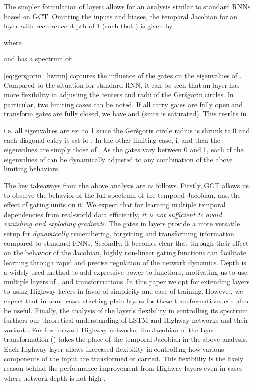 \documentclass[letterpaper]{article}
\def\gers{Ger\v{s}gorin}
\def\gct{GCT}
\def\srnn{standard RNN}
\begin{document}
The simpler formulation of \arch{} layers allows for an analysis similar to \srnn{s} based on GCT.
Omitting the inputs and biases, the temporal Jacobian  for an \arch{} layer with recurrence depth of 1 (such that ) is given by


where

and has a spectrum of:
 

\autoref{eq:gersgorin_hwrnn} captures the influence of the gates on the eigenvalues of . 
Compared to the situation for \srnn{}, it can be seen that an \arch{} layer has more flexibility in adjusting the centers and radii of the \gers{} circles. 
In particular, two limiting cases can be noted. If all carry gates are fully open and transform gates are fully closed, we have  and  (since  is saturated).
This results in

i.e. all eigenvalues are set to 1 since the \gers{} circle radius is shrunk to 0 and each diagonal entry is set to .  In the other limiting case, if  and  then the eigenvalues are simply those of .
As the gates vary between 0 and 1, each of the eigenvalues of  can be dynamically adjusted to any combination of the above limiting behaviors.

The key takeaways from the above analysis are as follows. 
Firstly, \gct{} allows us to observe the behavior of the full spectrum of the temporal Jacobian, and the effect of gating units on it.
We expect that for learning multiple temporal dependencies from real-world data efficiently, \emph{it is not sufficient to avoid vanishing and exploding gradients}.
The gates in \arch{} layers provide a more versatile setup for \emph{dynamically} remembering, forgetting and transforming information compared to \srnn{}s.
Secondly, it becomes clear that through their effect on the behavior of the Jacobian, highly non-linear gating functions can facilitate learning through rapid and precise regulation of the network dynamics.
Depth is a widely used method to add expressive power to functions, motivating us to use multiple layers of ,  and  transformations.
In this paper we opt for extending \arch{} layers to  using Highway layers in favor of simplicity and ease of training.
However, we expect that in some cases stacking plain layers for these transformations can also be useful.
Finally, the analysis of the \arch{} layer's flexibility in controlling its spectrum furthers our theoretical understanding of LSTM and Highway networks and their variants.
For feedforward Highway networks, the Jacobian of the layer transformation () takes the place of the temporal Jacobian in the above analysis.
Each Highway layer allows increased flexibility in controlling how various components of the input are transformed or carried.
This flexibility is the likely reason behind the performance improvement from Highway layers even in cases where network depth is not high \citep{kim2015}.
\end{document}
